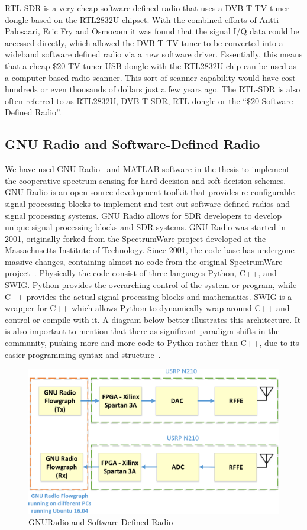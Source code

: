 RTL-SDR is a very cheap software defined radio that uses a DVB-T TV tuner dongle based on the RTL2832U chipset. With the combined efforts of Antti Palosaari, Eric Fry and Osmocom it was found that the signal I/Q data could be accessed directly, which allowed the DVB-T TV tuner to be converted into a wideband software defined radio via a new software driver. Essentially, this means that a cheap \$20 TV tuner USB dongle with the RTL2832U chip can be used as a computer based radio scanner. This sort of scanner capability would have cost hundreds or even thousands of dollars just a few years ago. The RTL-SDR is also often referred to as RTL2832U, DVB-T SDR, RTL dongle or the “\$20 Software Defined Radio”.

\subsection{GNU Radio and Software-Defined Radio}
We have used GNU Radio~\cite{gnradio} and MATLAB software in the thesis to implement the cooperative spectrum sensing for hard decision and soft decision schemes. GNU Radio  
is an open source development toolkit that provides re-configurable signal processing blocks to implement and test out software-defined radios and signal processing systems. GNU Radio allows for SDR developers to develop unique signal processing blocks and SDR systems. GNU Radio was started in 2001, originally forked from the SpectrumWare project developed at the Massachusetts Institute of Technology. Since 2001, the code base has undergone massive changes, containing almost no code from the original SpectrumWare project~\cite{bose1999virtual}. Physically the code consist of three languages Python, C++, and SWIG. Python provides the overarching control of the system or program, while C++ provides the actual signal processing blocks and mathematics. SWIG is a wrapper for C++ which allows Python to dynamically wrap around C++ and control or compile with it. A diagram below better illustrates this architecture. It is also important to mention that there as significant paradigm shifts in the community, pushing more and more code to Python rather than C++, due to its easier programming syntax and structure~\cite{collins2013implementation}.

\begin{figure}[ht!]
	\centering
	\includegraphics[width=\textwidth,keepaspectratio]{images/Gill/figs/gnuradio.eps}
    \caption{GNURadio and Software-Defined Radio} 
\label{gnuradio}      
\end{figure}

